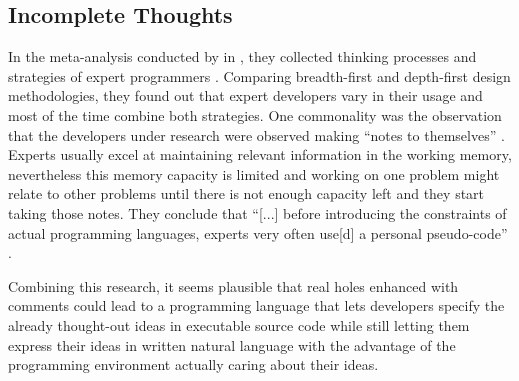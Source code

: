 \subsection{Incomplete Thoughts}
\label{sub:incomplete-thoughts}
In the meta-analysis  conducted by \citeauthor{visser_expert_1990} in \citeyear{visser_expert_1990}, they collected thinking processes and strategies of expert programmers \autocite{visser_expert_1990}.
Comparing breadth-first and depth-first design methodologies, they found out that expert developers vary in their usage and most of the time combine both strategies.
One commonality was the observation that the developers under research were observed making ``notes to themselves'' \autocite[241]{visser_expert_1990}.
Experts usually excel at maintaining relevant information in the working memory, nevertheless this memory capacity is limited and working on one problem might relate to other problems until there is not enough capacity left and they start taking those notes.
They conclude that ``[...] before introducing the constraints of actual programming languages, experts very often use[d] a personal pseudo-code'' \autocite[242]{visser_expert_1990}.

Combining this research, it seems plausible that real holes enhanced with comments could lead to a programming language that lets developers specify the already thought-out ideas in executable source code while still letting them express their ideas in written natural language with the advantage of the programming environment actually caring about their ideas.


